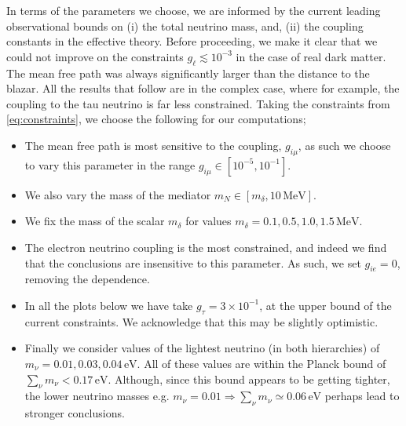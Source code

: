 \documentclass[11pt]{article}
\numberwithin{equation}{section}
\numberwithin{figure}{section}
\numberwithin{table}{section}
\begin{document}
In terms of the parameters we choose, we are informed by the current leading observational bounds on (i) the total neutrino mass, and, (ii) the coupling constants in the effective theory. Before proceeding, we make it clear that we could not improve on the constraints $g_{\ell} \lesssim 10^{-3}$ in the case of real dark matter. The mean free path was always significantly larger than the distance to the blazar. All the results that follow are in the complex case, where for example, the coupling to the tau neutrino is far less constrained. Taking the constraints from \eqref{eq:constraints}, we choose the following for our computations;
\begin{itemize}
  \item The mean free path is most sensitive to the coupling, $g_{i\mu}$, as such we choose to vary this parameter in the range $g_{i\mu} \in [10^{-5}, 10^{-1}]$.
  \item We also vary the mass of the mediator $m_N \in [m_\delta, 10\,\textrm{MeV}]$.
  \item We fix the mass of the scalar $m_\delta$ for values $m_\delta = 0.1, 0.5, 1.0, 1.5 \, \textrm{MeV}$.
  \item The electron neutrino coupling is the most constrained, and indeed we find that the conclusions are insensitive to this parameter. As such, we set $g_{ie} = 0$, removing the dependence.
  \item In all the plots below we have take $g_{\tau} = 3\times 10^{-1}$, at the upper bound of the current constraints. We acknowledge that this may be slightly optimistic.
  \item Finally we consider values of the lightest neutrino (in both hierarchies) of $m_\nu = 0.01, 0.03, 0.04\,\textrm{eV}$. All of these values are within the Planck bound of $\sum_{\nu}{m_\nu} < 0.17 \, \textrm{eV}$. Although, since this bound appears to be getting tighter, the lower neutrino masses e.g. $m_\nu = 0.01 \Rightarrow \sum_{\nu}{m_\nu} \simeq 0.06 \, \textrm{eV}$ perhaps lead to stronger conclusions.
\end{itemize}
\end{document}
